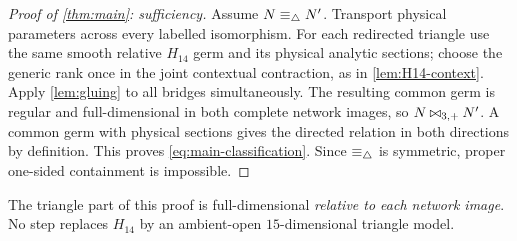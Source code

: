 \begin{proof}[Proof of \cref{thm:main}: sufficiency]
Assume \(N\equiv_\triangle N'\).  Transport physical parameters across every
labelled isomorphism.  For each redirected triangle use the same smooth
relative \(H_{14}\) germ and its physical analytic sections; choose the
generic rank once in the joint contextual contraction, as in
\cref{lem:H14-context}.  Apply \cref{lem:gluing} to all bridges
simultaneously.  The resulting common germ is regular and full-dimensional
in both complete network images, so \(N\mathbin{\bowtie}_{3,+} N'\).  A common germ with
physical sections gives the directed relation in both directions by
definition.  This proves \eqref{eq:main-classification}.  Since
\(\equiv_\triangle\) is symmetric, proper one-sided containment is impossible.
\end{proof}

The triangle part of this proof is full-dimensional \emph{relative to each
network image}.  No step replaces \(H_{14}\) by an ambient-open
\(15\)-dimensional triangle model.
